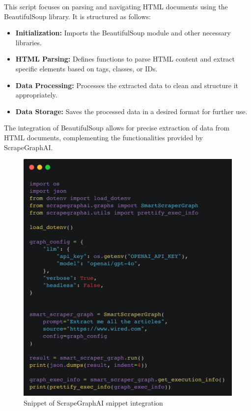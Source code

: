 This script focuses on parsing and navigating HTML documents using the BeautifulSoup library. It is structured as follows:

\begin{itemize}
    \item \textbf{Initialization:} Imports the BeautifulSoup module and other necessary libraries.
    \item \textbf{HTML Parsing:} Defines functions to parse HTML content and extract specific elements based on tags, classes, or IDs.
    \item \textbf{Data Processing:} Processes the extracted data to clean and structure it appropriately.
    \item \textbf{Data Storage:} Saves the processed data in a desired format for further use.
\end{itemize}

The integration of BeautifulSoup allows for precise extraction of data from HTML documents, complementing the functionalities provided by ScrapeGraphAI.

\begin{figure}[h!]
    \centering
    \includegraphics[width=0.95\linewidth]{Assets/smart_scraper_wired.png}
    \caption{Snippet of ScrapeGraphAI snippet integration}
    \label{fig:smart_scraper_wired}
\end{figure}

